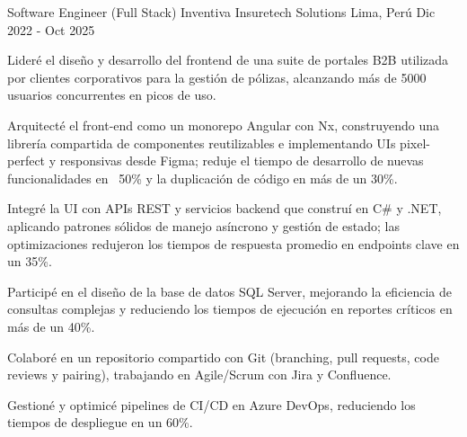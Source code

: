 

\begin{cventries}

  \cventry
    {Software Engineer (Full Stack)} %
    {Inventiva Insuretech Solutions} %
    {Lima, Perú} %
    {Dic 2022 - Oct 2025} %
    {
      \begin{cvitems} %
        \item {Lideré el diseño y desarrollo del frontend de una suite de portales B2B utilizada por clientes corporativos para la gestión de pólizas, alcanzando más de 5000 usuarios concurrentes en picos de uso.}
        \item {Arquitecté el front-end como un monorepo Angular con Nx, construyendo una librería compartida de componentes reutilizables e implementando UIs pixel-perfect y responsivas desde Figma; reduje el tiempo de desarrollo de nuevas funcionalidades en ~50\% y la duplicación de código en más de un 30\%.}
        \item {Integré la UI con APIs REST y servicios backend que construí en C\# y .NET, aplicando patrones sólidos de manejo asíncrono y gestión de estado; las optimizaciones redujeron los tiempos de respuesta promedio en endpoints clave en un 35\%.}
        \item {Participé en el diseño de la base de datos SQL Server, mejorando la eficiencia de consultas complejas y reduciendo los tiempos de ejecución en reportes críticos en más de un 40\%.}
        \item {Colaboré en un repositorio compartido con Git (branching, pull requests, code reviews y pairing), trabajando en Agile/Scrum con Jira y Confluence.}
        \item {Gestioné y optimicé pipelines de CI/CD en Azure DevOps, reduciendo los tiempos de despliegue en un 60\%.}
      \end{cvitems}
    }

\end{cventries}

